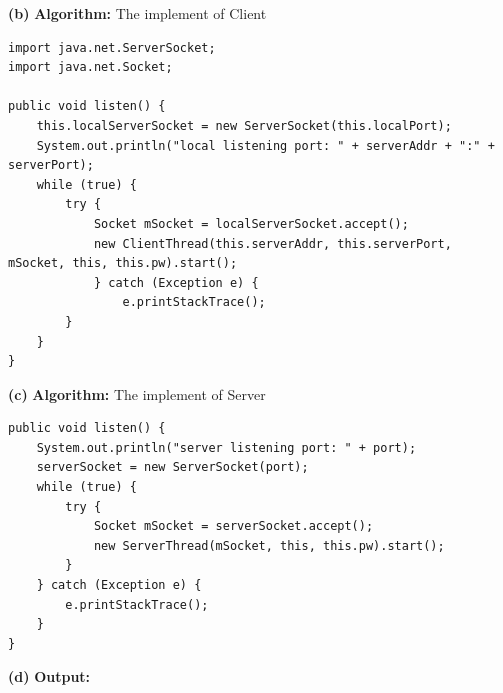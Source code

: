 \documentclass[11pt]{article}
\renewcommand\part[1]{\vspace{.10in}\textbf{(#1)}}
\newcommand\algorithm{\vspace{.10in}\textbf{Algorithm: }}
\newcommand\correctness{\vspace{.10in}\textbf{Output: }}
\begin{document}
\part{b} \algorithm The implement of Client
\begin{lstlisting}
import java.net.ServerSocket;
import java.net.Socket;

public void listen() {
    this.localServerSocket = new ServerSocket(this.localPort);
    System.out.println("local listening port: " + serverAddr + ":" + serverPort);
    while (true) {
        try {
            Socket mSocket = localServerSocket.accept();
            new ClientThread(this.serverAddr, this.serverPort, mSocket, this, this.pw).start();
            } catch (Exception e) {
                e.printStackTrace();
        }
    }
}
\end{lstlisting}

\part{c} \algorithm The implement of Server
\begin{lstlisting}
public void listen() {
    System.out.println("server listening port: " + port);
    serverSocket = new ServerSocket(port);
    while (true) {
        try {
            Socket mSocket = serverSocket.accept();
            new ServerThread(mSocket, this, this.pw).start();
        }
    } catch (Exception e) {
        e.printStackTrace();
    }
}
\end{lstlisting}



\part{d} \correctness
\end{document}
